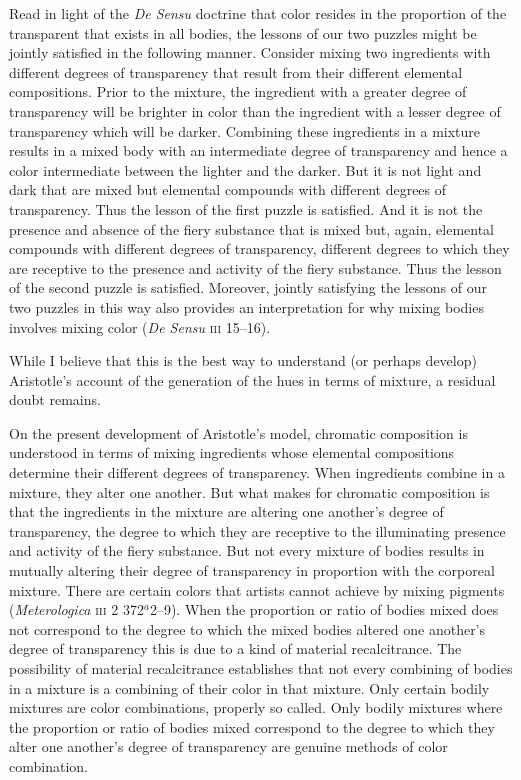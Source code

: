 Read in light of the \emph{De Sensu} doctrine that color resides in the proportion of the transparent that exists in all bodies, the lessons of our two puzzles might be jointly satisfied in the following manner. Consider mixing two ingredients with different degrees of transparency that result from their different elemental compositions. Prior to the mixture, the ingredient with a greater degree of transparency will be brighter in color than the ingredient with a lesser degree of transparency which will be darker. Combining these ingredients in a mixture results in a mixed body with an intermediate degree of transparency and hence a color intermediate between the lighter and the darker. But it is not light and dark that are mixed but elemental compounds with different degrees of transparency. Thus the lesson of the first puzzle is satisfied. And it is not the presence and absence of the fiery substance that is mixed but, again, elemental compounds with different degrees of transparency, different degrees to which they are receptive to the presence and activity of the fiery substance. Thus the lesson of the second puzzle is satisfied. Moreover, jointly satisfying the lessons of our two puzzles in this way also provides an interpretation for why mixing bodies involves mixing color (\emph{De Sensu} \textsc{iii} 15--16).

While I believe that this is the best way to understand (or perhaps develop) Aristotle's account of the generation of the hues in terms of mixture, a residual doubt remains. 

On the present development of Aristotle's model, chromatic composition is understood in terms of mixing ingredients whose elemental compositions determine their different degrees of transparency. When ingredients combine in a mixture, they alter one another. But what makes for chromatic composition is that the ingredients in the mixture are altering one another's degree of transparency, the degree to which they are receptive to the illuminating presence and activity of the fiery substance. But not every mixture of bodies results in mutually altering their degree of transparency in proportion with the corporeal mixture. There are certain colors that artists cannot achieve by mixing pigments (\emph{Meterologica} \textsc{iii} 2 372\( ^{a} \)2--9). When the proportion or ratio of bodies mixed does not correspond to the degree to which the mixed bodies altered one another's degree of transparency this is due to a kind of material recalcitrance. The possibility of material recalcitrance establishes that not every combining of bodies in a mixture is a combining of their color in that mixture. Only certain bodily mixtures are color combinations, properly so called. Only bodily mixtures where the proportion or ratio of bodies mixed correspond to the degree to which they alter one another's degree of transparency are genuine methods of color combination.

